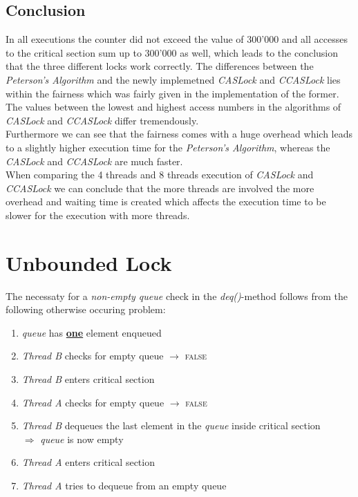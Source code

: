 \documentclass{article}
\begin{document}
\begin{adjustwidth}{2em}{2em}
		\subsection{Conclusion}
		\begin{adjustwidth}{2em}{2em}
			In all executions the counter did not exceed the value of 300'000 and all accesses to the critical section sum up to 300'000 as well, which leads to the conclusion that the three different locks work correctly. The differences between the \textit{Peterson's Algorithm} and the newly implemetned \textit{CASLock} and \textit{CCASLock} lies within the fairness which was fairly given in the implementation of the former. The values between the lowest and highest access numbers in the algorithms of \textit{CASLock} and \textit{CCASLock} differ tremendously. \\
			Furthermore we can see that the fairness comes with a huge overhead which leads to a slightly higher execution time for the \textit{Peterson's Algorithm}, whereas the \textit{CASLock} and \textit{CCASLock} are much faster. \\
			When comparing the 4 threads and 8 threads execution of \textit{CASLock} and \textit{CCASLock} we can conclude that the more threads are involved the more overhead and waiting time is created which affects the execution time to be slower for the execution with more threads.
		\end{adjustwidth}
	\end{adjustwidth}
	\newpage
    \section{Unbounded Lock}
    \begin{adjustwidth}{2em}{2em}
    	The necessaty for a \textit{non-empty queue} check in the \textit{deq()}-method follows from the following otherwise occuring problem:
    	\begin{enumerate}[-]
    		\item \textit{queue} has \underline{\textbf{one}} element enqueued
    		\item \textit{Thread B} checks for empty queue $\rightarrow$ \textsc{false}
    		\item \textit{Thread B} enters critical section
    		\item \textit{Thread A} checks for empty queue $\rightarrow$ \textsc{false}
    		\item \textit{Thread B} dequeues the last element in the \textit{queue} inside critical section \\
    		$\Rightarrow$ \textit{queue} is now empty
    		\item \textit{Thread A} enters critical section
    		\item \textit{Thread A} tries to dequeue from an empty queue
    	\end{enumerate}
    \end{adjustwidth}
    
\end{document}
